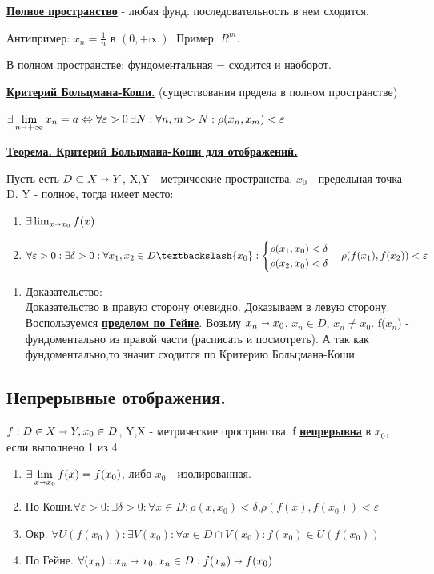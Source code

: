\documentclass{article}
\newcommand{\deff}[1]{\underline{\textbf{#1}}}
\newcommand{\thmm}[1]{\underline{\textbf{#1}}}
\newcommand{\prooff}[1]{{\underline{Доказательство:}} \\ }
\begin{document}
\deff{Полное пространство} - любая фунд. последовательность в нем сходится. 

Антипример: $x_n = \frac{1}{n}$ в $(0,+\infty)$. Пример: $R^m$.

В полном пространстве: фундоментальная = сходится и наоборот.

\deff{Критерий Больцмана-Коши.} (существования предела в полном пространстве)

$\exists \lim\limits_{n\shortrightarrow +\infty} x_n = a \Leftrightarrow \forall \varepsilon>0 \, \exists N: \forall n,m > N:\rho(x_n,x_m)<\varepsilon$

\thmm{Теорема. Критерий Больцмана-Коши для отображений.}

Пусть есть $D \subset X \shortrightarrow Y$, X,Y - метрические пространства. $x_0$ - предельная точка D. Y - полное, тогда имеет место:
\begin{enumerate}
    \item $\exists \lim_{x\shortrightarrow x_0} f(x) $
    \item $\forall \varepsilon>0: \exists \delta >0: \forall x_1,x_2 \in D\textbackslash\{x_0\}: 
    \begin{cases}
         \rho(x_1,x_0)<\delta \\
         \rho(x_2,x_0)<\delta
    \end{cases}
     \rho(f(x_1),f(x_2))<\varepsilon$
\end{enumerate}

\begin{enumerate}
    \item[] \prooff{}
    Доказательство в правую сторону очевидно. Доказываем в левую сторону.
    Воспользуемся \deff{пределом по Гейне}. Возьму $x_n \shortrightarrow x_0$, $x_n \in D$, $x_n \neq x_0$. f($x_n$) - фундоментально из правой части (расписать и посмотреть). А так как фундоментально,то значит сходится по Критерию Больцмана-Коши.
\end{enumerate}

\pagebreak
\subsection{Непрерывные отображения.} 

$f: D \in X \shortrightarrow Y, x_0 \in D$, Y,X - метрические пространства.
f \deff{непрерывна} в $x_0$, если выполнено 1 из 4:
\begin{enumerate}
    \item $\exists \lim\limits_{x\shortrightarrow x_0} f(x) = f(x_0)$, либо $x_0$ - изолированная.
    \item По Коши.$\forall \varepsilon>0:\exists \delta>0: \forall x\in D: \rho (x,x_0)<\delta$,$\rho(f(x),f(x_0))<\varepsilon$
    \item Окр. $\forall U(f(x_0)):\exists V(x_0): \forall x \in D \cap V(x_0): f(x_0) \in U(f(x_0))$
    \item По Гейне. $\forall (x_n): x_n \shortrightarrow x_0, x_n \in D: f(x_n) \shortrightarrow f(x_0)$
\end{enumerate}
\end{document}
